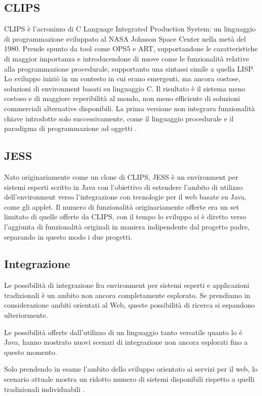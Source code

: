 \subsection{CLIPS}
CLIPS è l'acronimo di C Language Integrated Production System: un linguaggio di programmazione sviluppato al NASA Johnson Space Center nella metà del 1980. Prende spunto da tool come OPS5 e ART, supportandone le caratteristiche di maggior importanza e introducendone di nuove come le funzionalità relative alla programmazione procedurale, supportanto una sintassi simile a quella LISP. Lo sviluppo iniziò in un contesto in cui erano emergenti, ma ancora costose, soluzioni di environment basati su linguaggio C. Il risultato è il sistema meno costoso e di maggiore reperibilità al mondo, non meno efficiente di soluzioni commerciali alternative disponibili. La prima versione non integrava funzionalità chiave introdotte solo successivamente, come il linguaggio procedurale e il paradigma di programmazione ad oggetti \cite{jackson1999}.

\subsection{JESS}
Nato originariamente come un clone di CLIPS, JESS è un environment per sistemi esperti scritto in Java con l'obiettivo di estendere l'ambito di utilizzo dell'environment verso l'integrazione con tecnologie per il web basate su Java, come gli applet. Il numero di funzionalità originariamente offerte era un set limitato di quelle offerte da CLIPS, con il tempo lo sviluppo si è diretto verso l'aggiunta di funzionalità originali in maniera indipendente dal progetto padre, separando in questo modo i due progetti.

\subsection{Integrazione}
Le possibilità di integrazione fra environment per sistemi esperti e applicazioni tradizionali è un ambito non ancora completamente esplorato. Se prendiamo in considerazione ambiti orientati al Web, queste possibilità di ricerca si espandono ulteriormente.

Le possibilità offerte dall'utilizzo di un linguaggio tanto versatile quanto lo è Java, hanno mostrato nuovi scenari di integrazione non ancora esplorati fino a questo momento.

Solo prendendo in esame l'ambito dello sviluppo orientato ai servizi per il web, lo scenario attuale mostra un ridotto numero di sistemi disponibili rispetto a quelli tradizionali individuabili \cite{dokas2005}.

